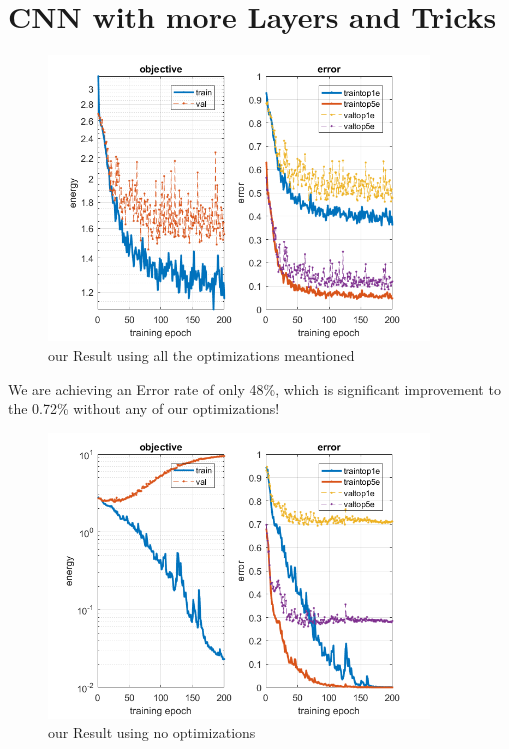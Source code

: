 \documentclass[12pt]{article}
\begin{document}
\newpage
\section{CNN with more Layers and Tricks}

        \begin{figure}[H]
            \centering
                \includegraphics[width=0.9\textwidth]{Plots/q4_plot_epo_200.png}
                \caption{our Result using all the optimizations meantioned}
        \end{figure}
        We are achieving an Error rate of only 48\%, which is significant improvement to the 0.72\% without any of our optimizations!
        \begin{figure}[H]
            \centering
                \includegraphics[width=0.9\textwidth]{Plots/init_plot_epo_200.png}
                \caption{our Result using no optimizations}
        \end{figure}
\end{document}
